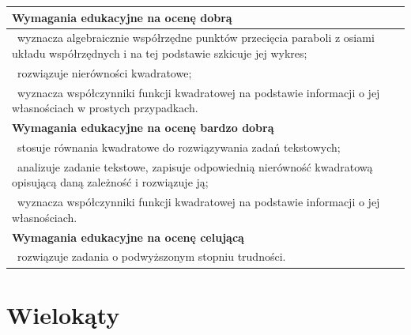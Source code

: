 \documentclass[12pt,a4paper]{article}
\begin{document}
\begin{longtable}{|p{16cm}|}
		\textbf{Wymagania edukacyjne na ocenę dobrą} \\ \hline
		
		\textbullet\ wyznacza algebraicznie współrzędne punktów przecięcia paraboli z osiami układu współrzędnych i na tej podstawie szkicuje jej wykres; \\
		
		\textbullet\ rozwiązuje nierówności kwadratowe; \\
		
		\textbullet\ wyznacza współczynniki funkcji kwadratowej na podstawie informacji o jej własnościach w prostych przypadkach. \\ \hline
		
		\textbf{Wymagania edukacyjne na ocenę bardzo dobrą} \\ \hline
		
		\textbullet\ stosuje równania kwadratowe do rozwiązywania zadań tekstowych; \\
		
		\textbullet\ analizuje zadanie tekstowe, zapisuje odpowiednią nierówność kwadratową opisującą daną zależność i rozwiązuje ją; \\
		
		\textbullet\ wyznacza współczynniki funkcji kwadratowej na podstawie informacji o jej własnościach. \\ \hline
		
		\textbf{Wymagania edukacyjne na ocenę celującą} \\ \hline
		
		\textbullet\ rozwiązuje zadania o podwyższonym stopniu trudności. \\ \hline
		
	\end{longtable}
	
	\section{Wielokąty}
	
\end{document}
